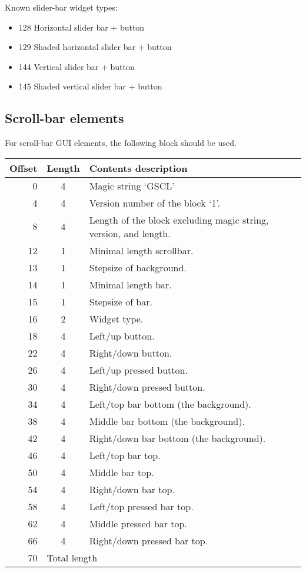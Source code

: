 \documentclass{article}
\begin{document}
Known slider-bar widget types:
\begin{itemize}
\item 128 Horizontal slider bar + button
\item 129 Shaded horizontal slider bar + button
\item 144 Vertical slider bar + button
\item 145 Shaded vertical slider bar + button
\end{itemize}


\subsection{Scroll-bar elements}
For scroll-bar GUI elements, the following block
should be used.
\begin{center}
\begin{tabular}{|r|c|l|} \hline
\textbf{Offset} & \textbf{Length} & \textbf{Contents description} \\ \hline
   0 &  4 & Magic string `GSCL' \\
   4 &  4 & Version number of the block `1'. \\
   8 &  4 & Length of the block excluding magic string, version, and length. \\
  12 &  1 & Minimal length scrollbar. \\
  13 &  1 & Stepsize of background. \\
  14 &  1 & Minimal length bar. \\
  15 &  1 & Stepsize of bar. \\
  16 &  2 & Widget type. \\
  18 &  4 & Left/up button. \\
  22 &  4 & Right/down button. \\ \hline
  26 &  4 & Left/up pressed button. \\
  30 &  4 & Right/down pressed button. \\ \hline
  34 &  4 & Left/top bar bottom (the background). \\
  38 &  4 & Middle bar bottom (the background). \\
  42 &  4 & Right/down bar bottom (the background). \\ \hline
  46 &  4 & Left/top bar top. \\
  50 &  4 & Middle bar top. \\
  54 &  4 & Right/down bar top. \\ \hline
  58 &  4 & Left/top pressed bar top. \\
  62 &  4 & Middle pressed bar top. \\
  66 &  4 & Right/down pressed bar top. \\ \hline
  70 & \multicolumn{2}{l|}{Total length} \\ \hline
\end{tabular}
\end{center}
\end{document}

